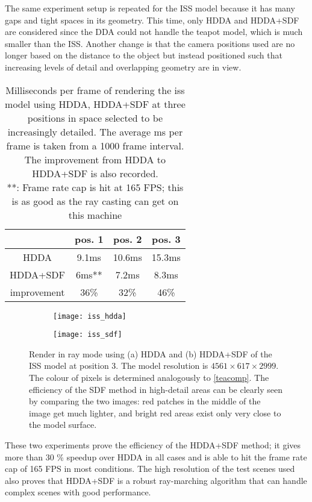 The same experiment setup is repeated for the ISS model because it has many gaps and tight spaces in its geometry. This time, only HDDA and HDDA+SDF are considered since the DDA could not handle the teapot model, which is much smaller than the ISS. Another change is that the camera positions used are no longer based on the distance to the object but instead positioned such that increasing levels of detail and overlapping geometry are in view.

\begin{table}[h]
  \centering
  \begin{tabular}{|c||c|c|c|}
    \hline
    & pos. 1 & pos. 2 & pos. 3 \\
    \hline
    HDDA & 9.1ms & 10.6ms & 15.3ms \\
    \hline
    HDDA+SDF & 6ms** & 7.2ms & 8.3ms\\
    \hline
    improvement & 36\% & 32\% & 46\%\\
    \hline
  \end{tabular}
  \caption{Milliseconds per frame of rendering the \acrshort{iss} model using HDDA, HDDA+SDF at three positions in space selected to be increasingly detailed. The average ms per frame is taken from a 1000 frame interval. The improvement from HDDA to HDDA+SDF is also recorded. \\
    **: Frame rate cap is hit at 165 FPS; this is as good as the ray casting can get on this machine}
\end{table}

\begin{figure}[H]
  \centering
  \begin{subfigure}[b]{0.45\textwidth}
    \texttt{[image: iss\_hdda]}
    \caption{}
  \end{subfigure}
  \hfill
  \begin{subfigure}[b]{0.45\textwidth}
    \texttt{[image: iss\_sdf]}
    \caption{}
  \end{subfigure}
  \caption{Render in ray mode using (a) HDDA and (b) HDDA+SDF of the ISS model at position 3. The model resolution is $4561\times617\times2999$. The colour of pixels is determined analogously to \cref{teacomp}. The efficiency of the SDF method in high-detail areas can be clearly seen by comparing the two images: red patches in the middle of the image get much lighter, and bright red areas exist only very close to the model surface.}
\end{figure}

These two experiments prove the efficiency of the HDDA+SDF method; it gives more than 30 \% speedup over HDDA in all cases and is able to hit the frame rate cap of 165 FPS in most conditions. The high resolution of the test scenes used also proves that HDDA+SDF is a robust ray-marching algorithm that can handle complex scenes with good performance.

